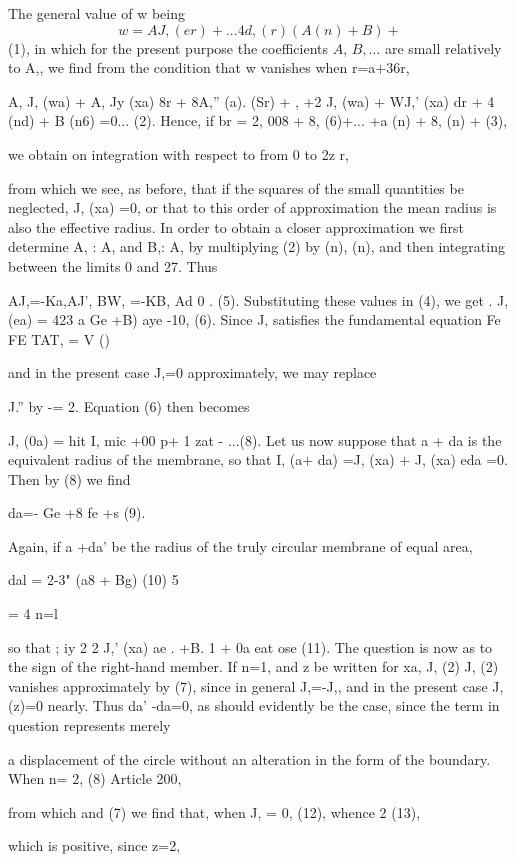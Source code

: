 The general value of w being
\[ w= A J, (er) +... 4d, (r) (A (n)+ B ) + \]
(1), in which for the present purpose the coefficients \(A\), \(B, \ldots\)
are small relatively to A,, we find from the condition that w vanishes when
r=a+36r,

A, J, (wa) + A, Jy (xa) 8r + 8A,'' (a). (Sr) + , +2 J, (wa) + WJ,' (xa)
dr + 4 (nd) + B (n6) =0... (2). Hence, if br = 2, 008 + 8, (6)+... +a
(n) + 8, (n) + (3),

we obtain on integration with respect to from 0 to 2z r,

from which we see, as before, that if the squares of the small
quantities be neglected, J, (xa) =0, or that to this order of
approximation the mean radius is also the effective radius. In order to
obtain a closer approximation we first determine A, : A, and B,: A, by
multiplying (2) by (n), (n), and then integrating between the limits 0
and 27. Thus

AJ,=-Ka,AJ', BW, =-KB, Ad 0 . (5). Substituting these values in (4), we
get . J,(ea) = 423 a Ge +B) aye -10, (6). Since J, satisfies the
fundamental equation Fe FE TAT, = V ()

and in the present case J,=0 approximately, we may replace

J.'' by -= 2. Equation (6) then becomes

J, (0a) = hit I, mic +00 p+ 1 zat - ...(8). Let us now suppose that a +
da is the equivalent radius of the membrane, so that I, (a+ da) =J, (xa)
+ J, (xa) eda =0. Then by (8) we find

da=- Ge +8 fe +s (9).

Again, if a +da' be the radius of the truly circular membrane of equal
area,

dal = 2-3" (a8 + Bg) (10) 5

= 4 n=l

so that ; iy 2 2 J,' (xa) ae . +B. 1 + 0a eat ose (11). The question is
now as to the sign of the right-hand member. If n=1, and z be written
for xa, J, (2) J, (2) vanishes approximately by (7), since in general
J,=-J,, and in the present case J,(z)=0 nearly. Thus da' -da=0, as
should evidently be the case, since the term in question represents
merely

a displacement of the circle without an alteration in the form of the
boundary. When n= 2, (8) Article 200,

from which and (7) we find that, when J, = 0, (12), whence 2 (13),

which is positive, since z=2,


